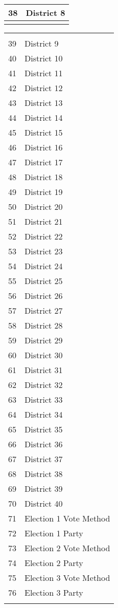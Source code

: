 \begin{table}[!htbp]
\begin{tabular}{@{\extracolsep{5pt}} cl}
38 & District 8 \\   
\hline \\[-1.8ex] 
\end{tabular}
\begin{tabular}{@{\extracolsep{5pt}} cl}
\\[-1.8ex]\hline 
\hline \\[-1.8ex] 
39 & District 9 \\ 
40 & District 10 \\ 
41 & District 11 \\ 
42 & District 12 \\ 
43 & District 13 \\ 
44 & District 14 \\ 
45 & District 15 \\ 
46 & District 16 \\ 
47 & District 17 \\ 
48 & District 18 \\ 
49 & District 19 \\ 
50 & District 20 \\ 
51 & District 21 \\ 
52 & District 22 \\ 
53 & District 23 \\ 
54 & District 24 \\ 
55 & District 25 \\ 
56 & District 26 \\ 
57 & District 27 \\ 
58 & District 28 \\ 
59 & District 29 \\ 
60 & District 30 \\ 
61 & District 31 \\ 
62 & District 32 \\ 
63 & District 33 \\ 
64 & District 34 \\ 
65 & District 35 \\ 
66 & District 36 \\ 
67 & District 37 \\ 
68 & District 38 \\ 
69 & District 39 \\ 
70 & District 40 \\ 
71 & Election 1 Vote Method \\ 
72 & Election 1 Party \\ 
73 & Election 2 Vote Method \\ 
74 & Election 2 Party \\ 
75 & Election 3 Vote Method \\ 
76 & Election 3 Party \\  
\hline \\[-1.8ex] 
\end{tabular}
\end{table} 
